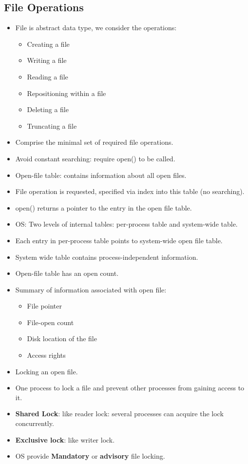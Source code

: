 \documentclass[10pt]{report}
\begin{document}
		\subsection{File Operations}
			\begin{itemize}
					\item File is abstract data type, we consider the operations:
					\begin{itemize}
							\item Creating a file
							\item Writing a file
							\item Reading a file
							\item Repositioning within a file
							\item Deleting a file
							\item Truncating a file
					\end{itemize}
					\item Comprise the minimal set of required file operations.
					\item Avoid constant searching: require open() to be called.
					\item Open-file table: contains information about all open files.
					\item File operation is requested, specified via index into this table (no searching).
					\item open() returns a pointer to the entry in the open file table.
					\item OS: Two levels of internal tables: per-process table and system-wide table.
					\item Each entry in per-process table points to system-wide open file table.
					\item System wide table contains process-independent information.
					\item Open-file table has an open count.
					\item Summary of information associated with open file:
					\begin{itemize}
							\item File pointer
							\item File-open count
							\item Disk location of the file
							\item Access rights
					\end{itemize}
					\item Locking an open file.
					\item One process to lock a file and prevent other processes from gaining access to it.
					\item \textbf{Shared Lock}: like reader lock: several processes can acquire the lock concurrently.
					\item \textbf{Exclusive lock}: like writer lock.
					\item OS provide \textbf{Mandatory} or \textbf{advisory} file locking.
			\end{itemize}
\end{document}

